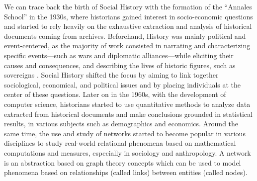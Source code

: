 We can trace back the birth of Social History with the formation of the ``Annales School'' in the 1930s, where historians gained interest in socio-economic questions and started to rely heavily on the exhaustive extraction and analysis of historical documents coming from archives\cite{blochApologiePourHistoire1949, prost2014}.
Beforehand, History was mainly political and event-centered, as the majority of work consisted in narrating and characterizing specific events---such as wars and diplomatic alliances---while eliciting their causes and consequences, and describing the lives of historic figures, such as sovereigns \cite{prost2014}.
Social History shifted the focus by aiming to link together sociological, economical, and political issues and by placing individuals at the center of these questions\cite{tilly1984retrieving}.
Later on in the 1960s, with the development of computer science, historians started to use quantitative methods to analyze data extracted from historical documents and make conclusions grounded in statistical results, in various subjects such as demographics\cite{henryRegistresParoissiauxHistoire1956} and economics\cite{goldinCliometricsNobel1995}.
Around the same time, the use and study of networks started to become popular in various disciplines to study real-world relational phenomena based on mathematical computations and measures, especially in sociology and anthropology\cite{cConceptUseSocial1969}.
A network is an abstraction based on graph theory concepts which can be used to model phenomena based on relationships (called links) between entities (called nodes).

